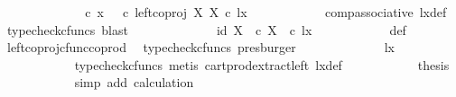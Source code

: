 \begin{isabellebody}
\ {\isacharminus}{\kern0pt}\ \isanewline
\ \ \ \ \ \ \ \ \isamarkupfalse%
\ {\isachardoublequoteopen}{\isasymrho}\ {\isasymcirc}\isactrlsub c\ x\ {\isacharequal}{\kern0pt}\ {\isacharparenleft}{\kern0pt}{\isasymrho}\ {\isasymcirc}\isactrlsub c\ left{\isacharunderscore}{\kern0pt}coproj\ X\ X{\isacharparenright}{\kern0pt}\ {\isasymcirc}\isactrlsub c\ lx{\isachardoublequoteclose}\isanewline
\ \ \ \ \ \ \ \ \ \ \isamarkupfalse%
\ comp{\isacharunderscore}{\kern0pt}associative{}\ lx{\isacharunderscore}{\kern0pt}def\ \isamarkupfalse%
\ {\isacharparenleft}{\kern0pt}typecheck{\isacharunderscore}{\kern0pt}cfuncs{\isacharcomma}{\kern0pt}\ blast{\isacharparenright}{\kern0pt}\isanewline
\ \ \ \ \ \ \ \ \isamarkupfalse%
\ \isamarkupfalse%
\ {\isachardoublequoteopen}{\isachardot}{\kern0pt}{\isachardot}{\kern0pt}{\isachardot}{\kern0pt}\ {\isacharequal}{\kern0pt}\ {\isasymlangle}id\ X{\isacharcomma}{\kern0pt}\ {\isasymt}\ {\isasymcirc}\isactrlsub c\ {\isasymbeta}\isactrlbsub X\isactrlesub {\isasymrangle}\ \ {\isasymcirc}\isactrlsub c\ lx{\isachardoublequoteclose}\isanewline
\ \ \ \ \ \ \ \ \ \ \isamarkupfalse%
\ {\isasymrho}{\isacharunderscore}{\kern0pt}def\ \ \isamarkupfalse%
\ left{\isacharunderscore}{\kern0pt}coproj{\isacharunderscore}{\kern0pt}cfunc{\isacharunderscore}{\kern0pt}coprod\ \isamarkupfalse%
\ {\isacharparenleft}{\kern0pt}typecheck{\isacharunderscore}{\kern0pt}cfuncs{\isacharcomma}{\kern0pt}\ presburger{\isacharparenright}{\kern0pt}\isanewline
\ \ \ \ \ \ \ \ \isamarkupfalse%
\ \isamarkupfalse%
\ {\isachardoublequoteopen}{\isachardot}{\kern0pt}{\isachardot}{\kern0pt}{\isachardot}{\kern0pt}\ {\isacharequal}{\kern0pt}\ {\isasymlangle}lx{\isacharcomma}{\kern0pt}\ {\isasymt}{\isasymrangle}{\isachardoublequoteclose}\isanewline
\ \ \ \ \ \ \ \ \ \ \isamarkupfalse%
\ {\isacharparenleft}{\kern0pt}typecheck{\isacharunderscore}{\kern0pt}cfuncs{\isacharcomma}{\kern0pt}\ metis\ cart{\isacharunderscore}{\kern0pt}prod{\isacharunderscore}{\kern0pt}extract{\isacharunderscore}{\kern0pt}left\ lx{\isacharunderscore}{\kern0pt}def{\isacharparenright}{\kern0pt}\isanewline
\ \ \ \ \ \ \ \ \isamarkupfalse%
\ \isamarkupfalse%
\ {\isacharquery}{\kern0pt}thesis\isanewline
\ \ \ \ \ \ \ \ \ \ \isamarkupfalse%
\ {\isacharparenleft}{\kern0pt}simp\ add{\isacharcolon}{\kern0pt}\ calculation{\isacharparenright}{\kern0pt}\isanewline
\ \ \ \ \ \ \isamarkupfalse%

\end{isabellebody}
